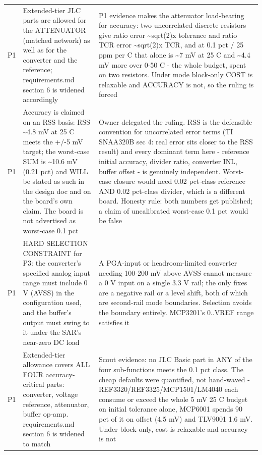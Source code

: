 \documentclass[11pt,a4paper]{article}
\begin{document}
{\begin{longtable}{lp{5.2cm}p{7.2cm}}
P1 & Extended-tier JLC parts are allowed for the ATTENUATOR (matched network) as well as for the converter and the reference; requirements.md section 6 is widened accordingly & P1 evidence makes the attenuator load-bearing for accuracy: two uncorrelated discrete resistors give ratio error \textasciitilde{}sqrt(2)x tolerance and ratio TCR error \textasciitilde{}sqrt(2)x TCR, and at 0.1 pct / 25 ppm per C that alone is \textasciitilde{}7 mV at 25 C and \textasciitilde{}4.4 mV more over 0-50 C - the whole budget, spent on two resistors. Under mode block-only COST is relaxable and ACCURACY is not, so the ruling is forced \\
P1 & Accuracy is claimed on an RSS basis: RSS \textasciitilde{}4.8 mV at 25 C meets the +/-5 mV target; the worst-case SUM is \textasciitilde{}10.6 mV (0.21 pct) and WILL be stated as such in the design doc and on the board's own claim. The board is not advertised as worst-case 0.1 pct & Owner delegated the ruling. RSS is the defensible convention for uncorrelated error terms (TI SNAA320B sec 4: real error sits closer to the RSS result) and every dominant term here - reference initial accuracy, divider ratio, converter INL, buffer offset - is genuinely independent. Worst-case closure would need 0.02 pct-class reference AND 0.02 pct-class divider, which is a different board. Honesty rule: both numbers get published; a claim of uncalibrated worst-case 0.1 pct would be false \\
P1 & HARD SELECTION CONSTRAINT for P3: the converter's specified analog input range must include 0 V (AVSS) in the configuration used, and the buffer's output must swing to it under the SAR's near-zero DC load & A PGA-input or headroom-limited converter needing 100-200 mV above AVSS cannot measure a 0 V input on a single 3.3 V rail; the only fixes are a negative rail or a level shift, both of which are second-rail mode boundaries. Selection avoids the boundary entirely. MCP3201's 0..VREF range satisfies it \\
P1 & Extended-tier allowance covers ALL FOUR accuracy-critical parts: converter, voltage reference, attenuator, buffer op-amp. requirements.md section 6 is widened to match & Scout evidence: no JLC Basic part in ANY of the four sub-functions meets the 0.1 pct class. The cheap defaults were quantified, not hand-waved - REF3320/REF3325/MCP1501/LM4040 each consume or exceed the whole 5 mV 25 C budget on initial tolerance alone, MCP6001 spends 90 pct of it on offset (4.5 mV) and TLV9001 1.6 mV. Under block-only, cost is relaxable and accuracy is not \\

\end{longtable}}
\end{document}
